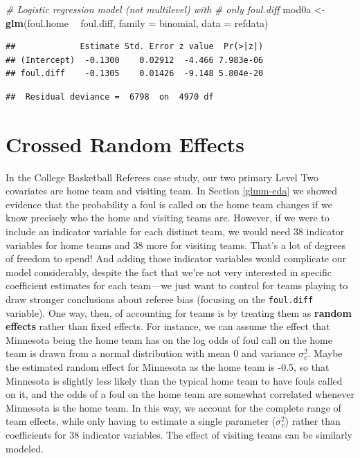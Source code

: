 \documentclass[
]{krantz}
\newenvironment{Shaded}{\begin{snugshade}}{\end{snugshade}}
\newcommand{\CommentTok}[1]{\textcolor[rgb]{0.37,0.37,0.37}{\textit{#1}}}
\newcommand{\DataTypeTok}[1]{\textcolor[rgb]{0.27,0.27,0.27}{#1}}
\newcommand{\KeywordTok}[1]{\textcolor[rgb]{0.27,0.27,0.27}{\textbf{#1}}}
\newcommand{\NormalTok}[1]{#1}
\newcommand{\OperatorTok}[1]{\textcolor[rgb]{0.43,0.43,0.43}{\textbf{#1}}}
\newcommand{\StringTok}[1]{\textcolor[rgb]{0.5,0.5,0.5}{#1}}
\begin{document}
\begin{Shaded}
\begin{Highlighting}[]
\CommentTok{# Logistic regression model (not multilevel) with }
\CommentTok{#   only foul.diff}
\NormalTok{mod0a <-}\StringTok{ }\KeywordTok{glm}\NormalTok{(foul.home }\OperatorTok{~}\StringTok{ }\NormalTok{foul.diff, }\DataTypeTok{family =}\NormalTok{ binomial, }
             \DataTypeTok{data =}\NormalTok{ refdata)}
\end{Highlighting}
\end{Shaded}

\begin{verbatim}
##             Estimate Std. Error z value  Pr(>|z|)
## (Intercept)  -0.1300    0.02912  -4.466 7.983e-06
## foul.diff    -0.1305    0.01426  -9.148 5.804e-20
\end{verbatim}

\begin{verbatim}
##  Residual deviance =  6798  on  4970 df
\end{verbatim}

\hypertarget{crossedre}{%
\section{Crossed Random Effects}\label{crossedre}}

In the College Basketball Referees case study, our two primary Level Two covariates are home team and visiting team. In Section \ref{glmm-eda} we showed evidence that the probability a foul is called on the home team changes if we know precisely who the home and visiting teams are. However, if we were to include an indicator variable for each distinct team, we would need 38 indicator variables for home teams and 38 more for visiting teams. That's a lot of degrees of freedom to spend! And adding those indicator variables would complicate our model considerably, despite the fact that we're not very interested in specific coefficient estimates for each team---we just want to control for teams playing to draw stronger conclusions about referee bias (focusing on the \texttt{foul.diff} variable). One way, then, of accounting for teams is by treating them as \textbf{random effects} rather than fixed effects. For instance, we can assume the effect that Minnesota being the home team has on the log odds of foul call on the home team is drawn from a normal distribution with mean 0 and variance \(\sigma^{2}_{v}\). Maybe the estimated random effect for Minnesota as the home team is -0.5, so that Minnesota is slightly less likely than the typical home team to have fouls called on it, and the odds of a foul on the home team are somewhat correlated whenever Minnesota is the home team. In this way, we account for the complete range of team effects, while only having to estimate a single parameter (\(\sigma^{2}_{v}\)) rather than coefficients for 38 indicator variables. The effect of visiting teams can be similarly modeled.
\end{document}
